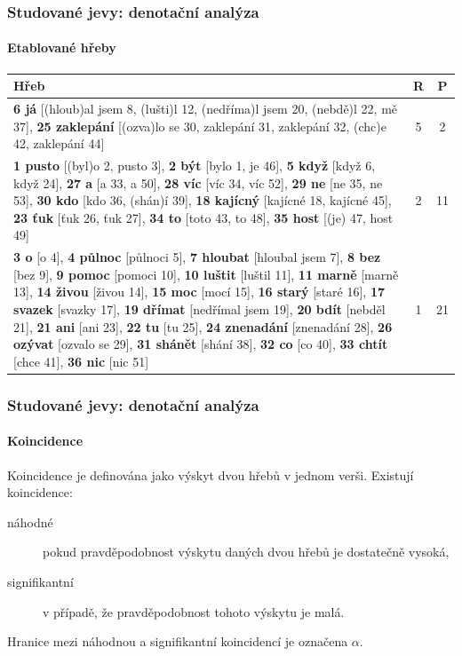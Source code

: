 \documentclass[12pt,xcolor=usenames,dvipsnames]{beamer}
\begin{document}
\begin{frame}
	\frametitle{Studované jevy: denotační analýza}
	\framesubtitle{Etablované hřeby}

	\vspace{-15pt}
	\begin{footnotesize}
		\begin {table}[H]
		\begin{center}
			\begin{tabular}{|p{10cm}|c|c|}
				\hline 
				\bfseries Hřeb & \bfseries R & \bfseries P \\ \hline
				\textbf{6 já} [(hloub)al jsem 8, (lušti)l 12, (nedříma)l jsem 20, (nebdě)l 22, mě 37], \textbf{25 zaklepání} [(ozva)lo se 30, zaklepání 31, zaklepání 32, (chc)e 42, zaklepání 44] 
				& 5 & 2 \\ \hline
				
				\textbf{1 pusto} [(byl)o 2, pusto 3], \textbf{2 být} [bylo 1, je 46], \textbf{5 když} [když 6, když 24], \textbf{27 a} [a 33, a 50], \textbf{28 víc} [víc 34, víc 52], \textbf{29 ne} [ne 35, ne 53], \textbf{30 kdo} [kdo 36, (shán)í 39], \textbf{18 kajícný} [kajícné 18, kajícné 45], \textbf{23 ťuk} [ťuk 26, ťuk 27], \textbf{34 to} [toto 43, to 48], \textbf{35 host} [(je) 47, host 49] 
				& 2 & 11\\ \hline
				
				\textbf{3 o} [o 4], \textbf{4 půlnoc} [půlnoci 5], \textbf{7 hloubat} [hloubal jsem 7], \textbf{8 bez} [bez 9], \textbf{9 pomoc} [pomoci 10], \textbf{10 luštit} [luštil 11], \textbf{11 marně} [marně 13], \textbf{14 živou} [živou 14], \textbf{15 moc} [mocí 15], \textbf{16 starý} [staré 16], \textbf{17 svazek} [svazky 17], \textbf{19 dřímat} [nedřímal jsem 19], \textbf{20 bdít} [nebděl 21], \textbf{21 ani} [ani 23], \textbf{22 tu} [tu 25], \textbf{24 znenadání} [znenadání 28], \textbf{26 ozývat} [ozvalo se 29], \textbf{31 shánět} [shání 38], \textbf{32 co} [co 40], \textbf{33 chtít} [chce 41], \textbf{36 nic} [nic 51]
				& 1 & 21 \\ \hline
		
			\end{tabular} 
		\end{center}
	\end{table}
	\end{footnotesize}
\end{frame}

\begin{frame}
	\frametitle{Studované jevy:  denotační analýza}
	\framesubtitle{Koincidence}

	Koincidence je definována jako výskyt dvou hřebů v jednom verši. Existují koincidence:
	
	\begin{description}
		\item[náhodné] pokud pravděpodobnost výskytu daných dvou hřebů je dostatečně vysoká,
		\item[signifikantní] v případě, že pravděpodobnost tohoto výskytu je malá.
	\end{description}

	Hranice mezi náhodnou a signifikantní koincidencí je označena $\alpha$.	

\end{frame}
\end{document}
